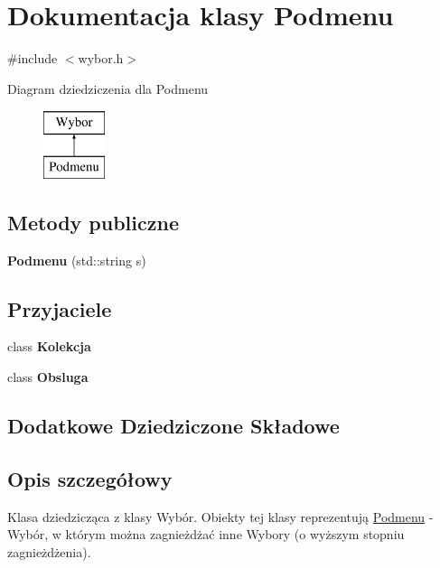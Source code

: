 \hypertarget{classPodmenu}{\section{Dokumentacja klasy Podmenu}
\label{classPodmenu}
}


{\ttfamily \#include $<$wybor.\-h$>$}

Diagram dziedziczenia dla Podmenu\begin{figure}[H]
\begin{center}
\leavevmode
\includegraphics[height=2.000000cm]{classPodmenu}
\end{center}
\end{figure}
\subsection*{Metody publiczne}
\begin{DoxyCompactItemize}
\item 
\hypertarget{classPodmenu_a959a79e13f3498087b22952da8b38baa}{{\bfseries Podmenu} (std\-::string s)}\label{classPodmenu_a959a79e13f3498087b22952da8b38baa}

\end{DoxyCompactItemize}
\subsection*{Przyjaciele}
\begin{DoxyCompactItemize}
\item 
\hypertarget{classPodmenu_acbfbc86fbec88d567dc6313b7419d6fa}{class {\bfseries Kolekcja}}\label{classPodmenu_acbfbc86fbec88d567dc6313b7419d6fa}

\item 
\hypertarget{classPodmenu_aaba4100c363553c323b55344e224e15d}{class {\bfseries Obsluga}}\label{classPodmenu_aaba4100c363553c323b55344e224e15d}

\end{DoxyCompactItemize}
\subsection*{Dodatkowe Dziedziczone Składowe}


\subsection{Opis szczegółowy}
Klasa dziedzicząca z klasy Wybór. Obiekty tej klasy reprezentują \hyperlink{classPodmenu}{Podmenu} -\/ Wybór, w którym można zagnieżdżać inne Wybory (o wyższym stopniu zagnieżdżenia). 